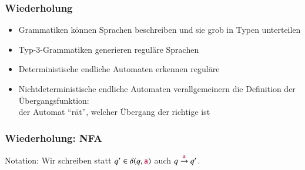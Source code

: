\documentclass[onlymath]{beamer}
\begin{document}
\maketitle


\begin{frame}\frametitle{Wiederholung}

\begin{itemize}
\item Grammatiken können Sprachen beschreiben und sie grob in Typen unterteilen
\item Typ-3-Grammatiken \alert{generieren} reguläre Sprachen
\item Deterministische endliche Automaten \alert{erkennen} reguläre 
\item Nichtdeterministische endliche Automaten verallgemeinern die Definition der Übergangsfunktion:\\ der Automat "`rät"', welcher Übergang der richtige ist
\end{itemize}

\end{frame}


\begin{frame}\frametitle{Wiederholung: NFA}

\medskip

\alert{Notation:} Wir schreiben statt $q'\in\delta(q,\mathtt{\textcolor{purple}{a}})$ auch $q\stackrel{\mathtt{\textcolor{purple}{a}}}{\to}q'$.

\end{frame}

\newcommand{\highlightTerm}[2]{%
\only<#1>{%
	\ghost{{\color{strongyellow}\rule[-0.5ex]{0.5em}{2.5ex}}}%
}%
\only<#1>{%
	\ghost{%
		\Sterm{%
			\textcolor{darkblue}{%
					#2%
			}%
		}%
	}%
}%
\invisible<#1>{\Sterm{#2}}%
}
\end{document}
